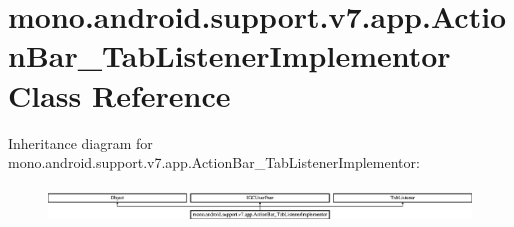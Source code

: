 \hypertarget{classmono_1_1android_1_1support_1_1v7_1_1app_1_1_action_bar___tab_listener_implementor}{}\section{mono.\+android.\+support.\+v7.\+app.\+Action\+Bar\+\_\+\+Tab\+Listener\+Implementor Class Reference}
\label{classmono_1_1android_1_1support_1_1v7_1_1app_1_1_action_bar___tab_listener_implementor}
Inheritance diagram for mono.\+android.\+support.\+v7.\+app.\+Action\+Bar\+\_\+\+Tab\+Listener\+Implementor\+:\begin{figure}[H]
\begin{center}
\leavevmode
\includegraphics[height=0.967185cm]{classmono_1_1android_1_1support_1_1v7_1_1app_1_1_action_bar___tab_listener_implementor}
\end{center}
\end{figure}
